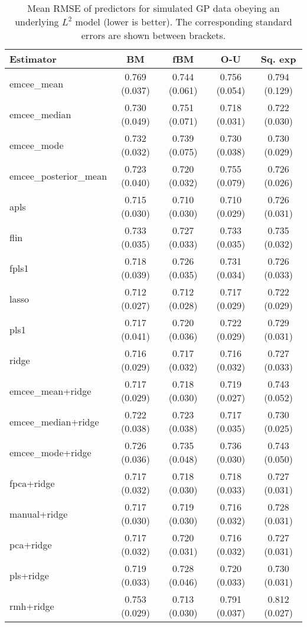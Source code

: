 \newpage

\setlength{\voffset}{0cm}
\setlength{\footskip}{50.75pt}

\begin{table}[p!]
  \centering
  \begin{tabular}{lcccc}
\toprule
            \textbf{Estimator} &            \textbf{BM} &           \textbf{fBM} &           \textbf{O-U} &        \textbf{Sq. exp} \\
\midrule
          emcee\_mean & 0.769 (0.037) & 0.744 (0.061) & 0.756 (0.054) & 0.794 (0.129) \\
        emcee\_median & 0.730 (0.049) & 0.751 (0.071) & 0.718 (0.031) & 0.722 (0.030) \\
          emcee\_mode & 0.732 (0.032) & 0.739 (0.075) & 0.730 (0.038) & 0.730 (0.029) \\
emcee\_posterior\_mean & 0.723 (0.040) & 0.720 (0.032) & 0.755 (0.079) & 0.726 (0.026) \\
                apls & 0.715 (0.030) & 0.710 (0.030) & 0.710 (0.029) & 0.726 (0.031) \\
                flin & 0.733 (0.035) & 0.727 (0.033) & 0.733 (0.035) & 0.735 (0.032) \\
               fpls1 & 0.718 (0.039) & 0.726 (0.035) & 0.731 (0.034) & 0.726 (0.033) \\
               lasso & 0.712 (0.027) & 0.712 (0.028) & 0.717 (0.029) & 0.722 (0.029) \\
                pls1 & 0.717 (0.041) & 0.720 (0.036) & 0.722 (0.029) & 0.729 (0.031) \\
               ridge & 0.716 (0.029) & 0.717 (0.032) & 0.716 (0.032) & 0.727 (0.033) \\
\bottomrule
\toprule
 emcee\_mean+ridge & 0.717 (0.029) & 0.718 (0.030) & 0.719 (0.027) & 0.743 (0.052) \\
emcee\_median+ridge & 0.722 (0.038) & 0.723 (0.038) & 0.717 (0.035) & 0.730 (0.025) \\
  emcee\_mode+ridge & 0.726 (0.036) & 0.735 (0.048) & 0.736 (0.030) & 0.743 (0.050) \\
        fpca+ridge & 0.717 (0.032) & 0.718 (0.030) & 0.718 (0.033) & 0.727 (0.031) \\
      manual+ridge & 0.717 (0.030) & 0.719 (0.030) & 0.716 (0.032) & 0.728 (0.031) \\
         pca+ridge & 0.717 (0.032) & 0.720 (0.031) & 0.716 (0.032) & 0.727 (0.031) \\
         pls+ridge & 0.719 (0.033) & 0.728 (0.046) & 0.720 (0.033) & 0.730 (0.031) \\
         rmh+ridge & 0.753 (0.029) & 0.713 (0.030) & 0.791 (0.037) & 0.812 (0.027) \\
\bottomrule
\end{tabular}
  \caption{Mean RMSE of predictors for simulated GP data obeying an underlying \(L^2\) model (lower is better). The corresponding standard errors are shown between brackets.}
\end{table}

